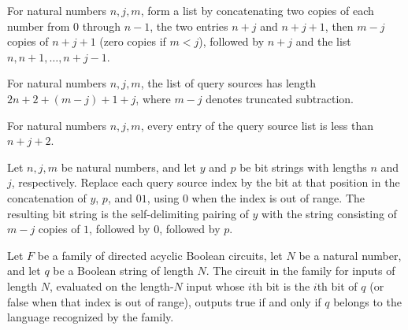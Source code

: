 \begin{definition}
\label{BoolCircuit.KarpLipton.querySrcs}
\leanok
For natural numbers $n,j,m$, form a list by concatenating two copies of each number from
$0$ through $n-1$, the two entries $n+j$ and $n+j+1$, then $m-j$ copies of $n+j+1$ (zero
copies if $m<j$), followed by $n+j$ and the list $n,n+1,\ldots,n+j-1$.
\end{definition}

\begin{theorem}
\label{BoolCircuit.KarpLipton.length_querySrcs}
\leanok
{}
For natural numbers $n,j,m$, the list of query sources has length $2n+2+(m-j)+1+j$,
where $m-j$ denotes truncated subtraction.
\end{theorem}

\begin{theorem}
\label{BoolCircuit.KarpLipton.querySrcs_lt}
\leanok
{}
For natural numbers $n,j,m$, every entry of the query source list is less than $n+j+2$.
\end{theorem}

\begin{theorem}
\label{BoolCircuit.KarpLipton.querySrcs_map}
\leanok
{}
Let $n,j,m$ be natural numbers, and let $y$ and $p$ be bit strings with lengths $n$ and
$j$, respectively. Replace each query source index by the bit at that position in the
concatenation of $y$, $p$, and $01$, using $0$ when the index is out of range. The
resulting bit string is the self-delimiting pairing of $y$ with the string consisting of
$m-j$ copies of $1$, followed by $0$, followed by $p$.
\end{theorem}

\begin{theorem}
\label{BoolCircuit.family_eval_getD}
\leanok
{}
Let $F$ be a family of directed acyclic Boolean circuits, let $N$ be a natural number,
and let $q$ be a Boolean string of length $N$. The circuit in the family for inputs of
length $N$, evaluated on the length-$N$ input whose $i$th bit is the $i$th bit of $q$
(or false when that index is out of range), outputs true if and only if $q$ belongs to
the language recognized by the family.
\end{theorem}

